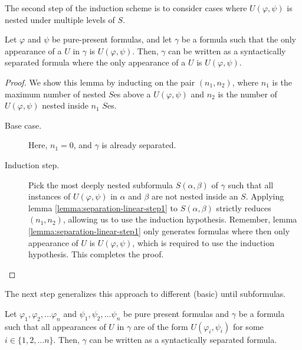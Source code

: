 \documentclass[a4paper,UKenglish,cleveref, autoref, thm-restate, numberwithinsect]{lipics-v2021}
\begin{document}
The second step of the induction scheme is to consider cases where $U(\varphi, \psi)$ is nested under multiple levels of $S$.
\begin{lemma}
\label{lemma:separation-linear-step2}
    Let $\varphi$ and $\psi$ be pure-present formulas, and let $\gamma$ be a formula such that the only appearance of a $U$ in $\gamma$ is $U(\varphi, \psi)$. Then, $\gamma$ can be written as a syntactically separated formula where the only appearance of a $U$ is $U(\varphi, \psi)$.
\end{lemma}
\begin{proof}
    We show this lemma by inducting on the pair $(n_1, n_2)$, where $n_1$ is the maximum number of nested $S$es above a $U(\varphi, \psi)$ and $n_2$ is the number of $U(\varphi, \psi)$ nested inside $n_1$ $S$es.
    \begin{description}
        \item[Base case.] Here, $n_1 = 0$, and $\gamma$ is already separated.
        \item[Induction step.] Pick the most deeply nested subformula $S(\alpha, \beta)$ of $\gamma$ such that all instances of $U(\varphi, \psi)$ in $\alpha$ and $\beta$ are not nested inside an $S$. Applying lemma \ref{lemma:separation-linear-step1} to $S(\alpha, \beta)$ strictly reduces $(n_1, n_2)$, allowing us to use the induction hypothesis. Remember, lemma \ref{lemma:separation-linear-step1} only generates formulas where then only appearance of $U$ is $U(\varphi, \psi)$, which is required to use the induction hypothesis. This completes the proof.
    \end{description}
\end{proof}
The next step generalizes this approach to different (basic) until subformulas.
\begin{lemma}
\label{lemma:separation-linear-step3}
    Let $\varphi_1, \varphi_2, \ldots \varphi_n$ and $\psi_1, \psi_2, \ldots \psi_n$ be pure present formulas and $\gamma$ be a formula such that all appearances of $U$ in $\gamma$ are of the form $U(\varphi_i, \psi_i)$ for some $i \in \{1, 2, \ldots n\}$. Then, $\gamma$ can be written as a syntactically separated formula.
\end{lemma}
\end{document}
